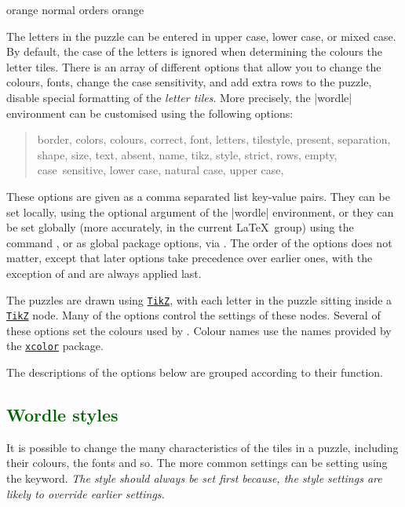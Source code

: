 \documentclass[svgnames]{report}
\newcommand\ctan[1]{\href{https://www.ctan.org/pkg/#1}{\texttt{#1}}}
\newcommand\Section[1]{\subsection{\textcolor{DarkGreen}{#1}}}
\begin{document}
  \begin{example}
    \begin{wordle}[rows=4]{orange}
       normal
       orders
       orange
    \end{wordle}
  \end{example}

  The letters in the puzzle can be entered in upper case, lower case, or
  mixed case. By default, the case of the letters is ignored when
  determining the colours the letter tiles.  There is an array of
  different options that allow you to  change the colours, fonts, change
  the case sensitivity, and add extra rows to the puzzle, disable
  special formatting of the \textit{letter tiles}. More precisely,
  the \keyword|wordle| environment can be customised using the
  following options:
  \begin{quote}\sffamily\color{Crimson}
    border,
    colors,
    colours,
    correct,
    font,
    letters,
    tilestyle,
    present,
    separation,
    shape,
    size,
    text,
    absent,
    name,
    tikz,
    style,
    strict,
    rows,
    empty,
    case~sensitive,
    lower case,
    natural case,
    upper case,
  \end{quote}
  These options are given as a comma separated list key-value pairs.
  They can be set locally, using the optional argument of the
  \keyword|wordle| environment, or they can be set globally (more
  accurately, in the current \LaTeX\ group) using the
  \keyword{\WordleSetup} command , or
  as global package options, via \keyword{\usepackage[options]{wordle}}.
  The order of the options does not matter, except that later options
  take precedence over earlier ones, with the exception of 
  and  are always applied last.

  The  puzzles are drawn using \ctan{TikZ}, with each
  letter in the puzzle sitting inside a \ctan{TikZ} node. Many of the
  options control the settings of these nodes. Several of these options
  set the colours used by . Colour names use the
   names provided by the \ctan{xcolor} package.

  The descriptions of the options below are grouped according to their
  function.

  \Section{Wordle styles}

  It is possible to change the many characteristics of the tiles in a
   puzzle, including their colours, the fonts and so.
  The more common settings can be setting using the 
  keyword. \textit{The style should always be set first because,
  the style settings are likely to override earlier settings.}
\end{document}
